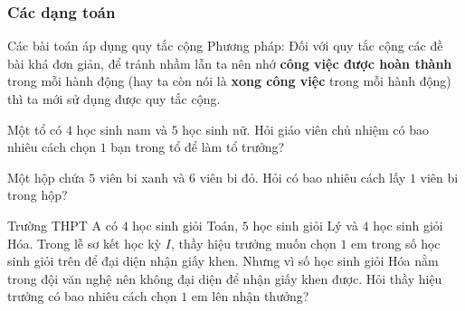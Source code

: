\subsubsection{Các dạng toán}
\begin{dang}{Các bài toán áp dụng quy tắc cộng}
Phương pháp: Đối với quy tắc cộng các đề bài khá đơn giản, để tránh nhầm lẫn ta nên nhớ \textbf{công việc được hoàn thành} trong mỗi hành động (hay ta còn nói là \textbf{xong công việc} trong mỗi hành động) thì ta mới sử dụng được quy tắc cộng.
\end{dang}
\begin{vd}%
Một tổ có $4$ học sinh nam và $5$ học sinh nữ. Hỏi giáo viên chủ nhiệm có bao nhiêu cách chọn $1$ bạn trong tổ để làm tổ trưởng?
\end{vd}
\begin{vd}%
Một hộp chứa $5$ viên bi xanh và $6$ viên bi đỏ. Hỏi có bao nhiêu cách lấy $1$ viên bi trong hộp?
\end{vd}

\begin{vd}%
Trường THPT A có $4$ học sinh giỏi Toán, $5$ học sinh giỏi Lý và $4$ học sinh giỏi Hóa. Trong lễ sơ kết học kỳ $I$, thầy hiệu trưởng muốn chọn $1$ em trong số học sinh giỏi trên để đại diện nhận giấy khen. Nhưng vì số học sinh giỏi Hóa nằm trong đội văn nghệ nên không đại diện để nhận giấy khen được. Hỏi thầy hiệu trưởng có bao nhiêu cách chọn $1$ em lên nhận thưởng?
\end{vd}


